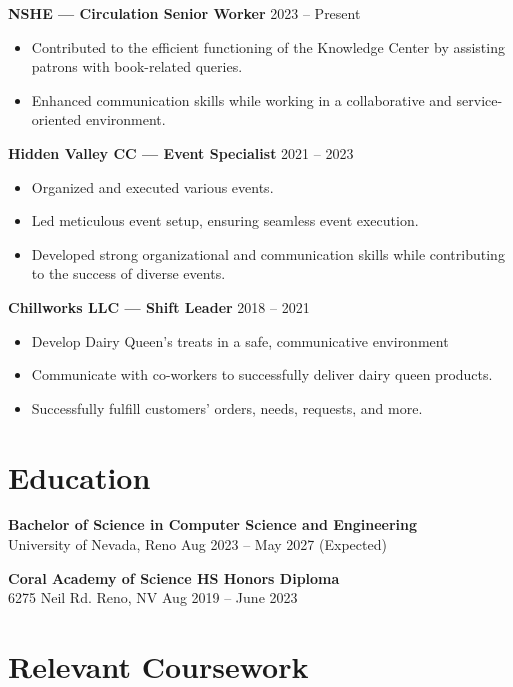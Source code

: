 \documentclass[10pt]{article}
\begin{document}
\textbf{NSHE — Circulation Senior Worker} \hfill 2023 -- Present
\begin{itemize}
    \item Contributed to the efficient functioning of the Knowledge Center by assisting patrons with book-related queries.
    \item Enhanced communication skills while working in a collaborative and service-oriented environment.
\end{itemize}

\textbf{Hidden Valley CC — Event Specialist} \hfill 2021 -- 2023
\begin{itemize}
    \item Organized and executed various events.
    \item Led meticulous event setup, ensuring seamless event execution.
    \item Developed strong organizational and communication skills while contributing to the success of diverse events.
\end{itemize}

\textbf{Chillworks LLC — Shift Leader} \hfill 2018 -- 2021
\begin{itemize}
    \item Develop Dairy Queen’s treats in a safe, communicative environment
    \item Communicate with co-workers to successfully deliver dairy queen products.
    \item Successfully fulfill customers’ orders, needs, requests, and more.
\end{itemize}

\section*{Education}

\textbf{Bachelor of Science in Computer Science and Engineering} \\
University of Nevada, Reno \hfill Aug 2023 -- May 2027 (Expected)

\textbf{Coral Academy of Science HS Honors Diploma} \\
6275 Neil Rd. Reno, NV \hfill Aug 2019 -- June 2023

\section*{Relevant Coursework}
\end{document}
